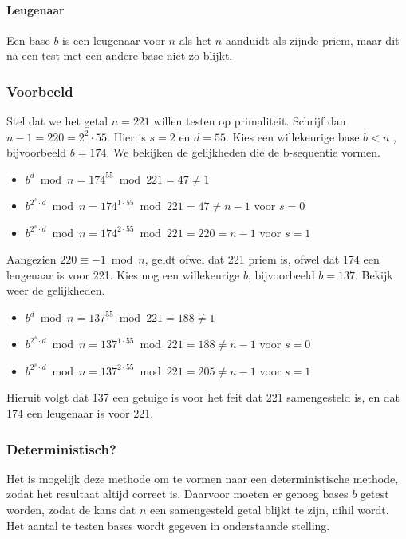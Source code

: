 \documentclass[11pt]{article}
\begin{document}
\paragraph{Leugenaar}
Een base $b$ is een leugenaar voor $n$ als het $n$ aanduidt als zijnde priem, maar dit na een test met een andere base niet zo blijkt.

\subsubsection{Voorbeeld}
Stel dat we het getal $n=221$ willen testen op primaliteit. Schrijf dan $n-1 = 220 = 2^2 \cdot 55$. Hier is $s=2$ en $d=55$. Kies een willekeurige base $b < n$ , bijvoorbeeld $b=174$. We bekijken de gelijkheden die de b-sequentie vormen.
\begin{itemize}
  \item $b^d \bmod{n} = 174^{55} \bmod{221} = 47 \ne 1$
  \item $b^{2^s \cdot d} \bmod{n} = 174^{1 \cdot 55} \bmod{221} = 47 \ne n-1$ voor $s=0$
  \item $b^{2^s \cdot d} \bmod{n} = 174^{2 \cdot 55} \bmod{221} = 220 = n-1$ voor $s=1$
\end{itemize}
Aangezien $220 \equiv -1 \bmod{n}$, geldt ofwel dat 221 priem is, ofwel dat 174 een leugenaar is voor 221. Kies nog een willekeurige $b$, bijvoorbeeld $b=137$. Bekijk weer de gelijkheden.
\begin{itemize}
  \item $b^d \bmod{n} = 137^{55} \bmod{221} = 188 \ne 1$
  \item $b^{2^s \cdot d} \bmod{n} = 137^{1 \cdot 55} \bmod{221} = 188 \ne n-1$ voor $s=0$
  \item $b^{2^s \cdot d} \bmod{n} = 137^{2 \cdot 55} \bmod{221} = 205 \ne n-1$ voor $s=1$
\end{itemize}
Hieruit volgt dat 137 een getuige is voor het feit dat 221 samengesteld is, en dat 174 een leugenaar is voor 221.

\subsubsection{Deterministisch?}
Het is mogelijk deze methode om te vormen naar een deterministische me\-tho\-de, zodat het resultaat altijd correct is. Daarvoor moeten er genoeg bases $b$ getest worden, zodat de kans dat $n$ een samengesteld getal blijkt te zijn, nihil wordt. Het aantal te testen bases wordt gegeven in onderstaande stelling.
\end{document}
